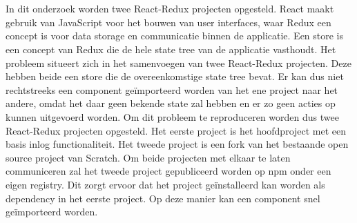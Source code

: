 
%
%

%



\chapter*{}

In dit onderzoek worden twee React-Redux projecten opgesteld. React maakt gebruik van JavaScript voor het bouwen van user interfaces, waar Redux een concept is voor data storage en communicatie binnen de applicatie. Een store is een concept van Redux die de hele state tree van de applicatie vasthoudt. Het probleem situeert zich in het samenvoegen van twee React-Redux projecten. Deze hebben beide een store die de overeenkomstige state tree bevat. Er kan dus niet rechtstreeks een component geïmporteerd worden van het ene project naar het andere, omdat het daar geen bekende state zal hebben en er zo geen acties op kunnen uitgevoerd worden. Om dit probleem te reproduceren worden dus twee React-Redux projecten opgesteld. Het eerste project is het hoofdproject  met een basis inlog functionaliteit. Het tweede project is een fork van het bestaande open source project van Scratch. Om beide projecten met elkaar te laten communiceren zal het tweede project gepubliceerd worden op npm onder een eigen registry. Dit zorgt ervoor dat het project geïnstalleerd kan worden als dependency in het eerste project. Op deze manier kan een component snel geïmporteerd worden. 

